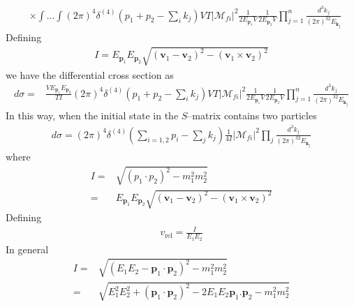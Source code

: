 \begin{borrar}
\begin{align}
&\times\int\ldots\int 
(2\pi)^4\delta^{(4)}\left(p_1+p_2-\sum_i k_j\right)VT 
\left|\mathcal{M}_{fi}\right|^2
\frac{1}{2E_{\mathbf{p}_1}V}\frac{1}{2E_{\mathbf{p}_2}V}
\prod_{j=1}^n\frac{d^3k_j}{(2\pi)^32E_{\mathbf{k}_j}}
\end{align}
Defining
\begin{align}
  I=E_{\mathbf{p}_1} E_{\mathbf{p}_2} \sqrt{(\mathbf{v}_1-\mathbf{v}_2)^2-(\mathbf{v}_1\times\mathbf{v}_2)^2}
\end{align}
we have the differential cross section as
\begin{align}
  d\sigma=&\frac{V E_{\mathbf{p}_1} E_{\mathbf{p}_2} }{T I}
(2\pi)^4\delta^{(4)}\left(p_1+p_2-\sum_i k_j\right)VT 
\left|\mathcal{M}_{fi}\right|^2
\frac{1}{2E_{\mathbf{p}_1}V}\frac{1}{2E_{\mathbf{p}_2}V}
\prod_{j=1}^n\frac{d^3k_j}{(2\pi)^32E_{\mathbf{k}_j}}
\end{align}
In this way, when the initial state in the $S$--matrix contains two particles
\begin{align}
  d\sigma=(2\pi)^4\delta^{(4)}\left(\sum_{i=1,2} p_i-\sum_{j}k_j\right)
\frac{1}{4I}\left|\mathcal{M}_{fi}\right|^2
\prod_{j}\frac{d^3k_j}{(2\pi)^32E_{\mathbf{k}_j}}
\end{align}
where
\begin{align}
  I=&\sqrt{(p_1\cdot p_2)^2-m_1^2m_2^2}\nonumber\\
=&E_{\mathbf{p}_1} E_{\mathbf{p}_2} \sqrt{(\mathbf{v}_1-\mathbf{v}_2)^2-(\mathbf{v}_1\times\mathbf{v}_2)^2}
\end{align}
Defining 
\begin{align}
  v_{\text{rel}}=\frac{I}{E_1E_2}
\end{align}
In general
\begin{align}
  I=&\sqrt{(E_1 E_2-\mathbf{p}_1\cdot\mathbf{p}_2)^2-m_1^2m_2^2}\nonumber\\
  =&\sqrt{E_1^2E_2^2+(\mathbf{p}_1\cdot\mathbf{p}_2)^2-2E_1 E_2\mathbf{p}_1.\mathbf{p}_2 -m_1^2m_2^2}
\end{align}


\end{borrar}
